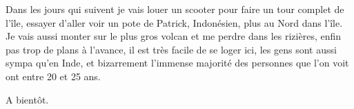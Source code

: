 \begin{multicols}{2}

Dans les jours qui suivent je vais louer un scooter pour faire un tour complet de l'île, essayer d'aller voir un pote de Patrick, Indonésien, plus au Nord dans l'île. Je vais aussi monter sur le plus gros volcan et me perdre dans les rizières, enfin pas trop de plans à l'avance, il est très facile de se loger ici, les gens sont aussi sympa qu'en Inde, et bizarrement l'immense majorité des personnes que l'on voit ont entre 20 et 25 ans.

A bientôt.

\end{multicols}


